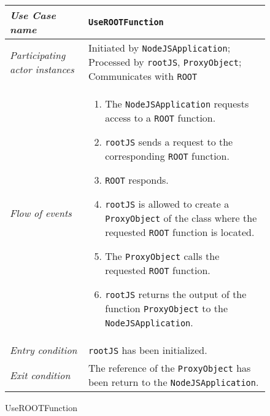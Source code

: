 \begin{figure}[htb]
	\centering
	\begin{longtable}{p{3cm} @{\hskip 1cm} p{12cm}}
		\hline
		
		\textit{Use Case name} & \texttt{UseROOTFunction}\\
		\hline
		
		\textit{Participating actor instances} & Initiated by \texttt{NodeJSApplication};
                Processed by \texttt{rootJS}, \texttt{ProxyObject};
                Communicates with \texttt{ROOT}\\
		\hline
		
		\textit{Flow of events} &
			\begin{enumerate}
				\item The \texttt{NodeJSApplication}  requests access to a \texttt{ROOT} function.
				
				\item \texttt{rootJS} sends a request to the corresponding \texttt{ROOT} function.
				
				\item \texttt{ROOT} responds.
				
				\item \texttt{rootJS} is allowed to create a \texttt{ProxyObject} of the class where the requested \texttt{ROOT} function is located.
				
				\item The \texttt{ProxyObject} calls the requested \texttt{ROOT} function.
				
				\item \texttt{rootJS} returns the output of the function \texttt{ProxyObject} to the \texttt{NodeJSApplication}.
			\end{enumerate}
			\\
		\hline
		
		\textit{Entry condition} & \texttt{rootJS} has been initialized.\\
		\hline
		
		\textit{Exit condition} & The reference of the \texttt{ProxyObject} has been return to the \texttt{NodeJSApplication}.\\
        \hline
	\end{longtable}
	
	\caption{UseROOTFunction}
\end{figure}

